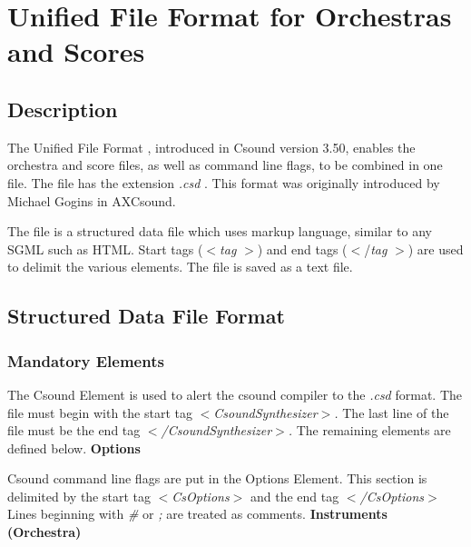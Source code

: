 \begin{comment}
\documentclass[10pt]{article}
\usepackage{fullpage, graphicx, url}
\setlength{\parskip}{1ex}
\setlength{\parindent}{0ex}
\title{Unified File Format for Orchestras and Scores}



\begin{tabular}{ccc}
The Alternative Csound Reference Manual & & \\
Previous &The Csound Command &Next

\end{tabular}

\end{comment}
\section{Unified File Format for Orchestras and Scores}
\subsection*{Description}


  The Unified File Format , introduced in Csound version 3.50, enables the orchestra and score files, as well as command line flags, to be combined in one file. The file has the extension \emph{.csd}
. This format was originally introduced by Michael Gogins in AXCsound. 


  The file is a structured data file which uses markup language, similar to any SGML such as HTML. Start tags ($<$\emph{tag}
$>$) and end tags ($<$/\emph{tag}
$>$) are used to delimit the various elements. The file is saved as a text file. 
\subsection*{Structured Data File Format}
\subsubsection*{Mandatory Elements}


  The Csound Element is used to alert the csound compiler to the \emph{.csd}
 format. The file must begin with the start tag \emph{$<$CsoundSynthesizer$>$. }
The last line of the file must be the end tag \emph{$<$/CsoundSynthesizer$>$.}
 The remaining elements are defined below. 
\textbf{Options}


  Csound command line flags are put in the Options Element. This section is delimited by the start tag \emph{$<$CsOptions$>$}
 and the end tag \emph{$<$/CsOptions$>$ }
Lines beginning with \emph{\#}
 or \emph{;}
 are treated as comments. 
\textbf{Instruments (Orchestra)}


